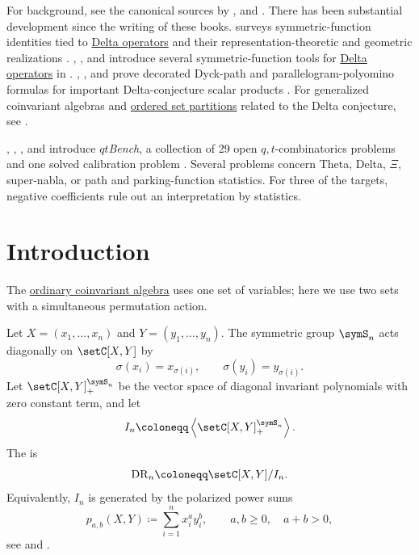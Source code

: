 


For background, see the canonical sources by 
\cite{qtCatalanBook}, and  \cite{Bergeron2009}.
There has been substantial development since the writing of these books.
 surveys symmetric-function identities tied to
\hyperref[deltaOperator]{Delta operators} and their representation-theoretic and geometric realizations
\cite{Rhoades2022Delta}.
, , and  introduce
several symmetric-function tools for \hyperref[deltaOperator]{Delta operators} in
\cite{GarsiaHaglundRomero2018}.
, , and
 prove decorated Dyck-path and parallelogram-polyomino
formulas for important Delta-conjecture scalar products
\cite{DAdderioIraciWyngaerd2022}.  For generalized coinvariant algebras and
\hyperref[setPartitions]{ordered set partitions} related to the Delta
conjecture, see
\cite{HaglundRhoadesShimozono2018,Griffin2021}.

, ,
, and  introduce
\emph{$qt$Bench}, a collection of 29 open $q,t$-combinatorics problems and one
solved calibration problem \cite{CainelliLuccioliIraciPaolini2026x}.  Several
problems concern Theta, Delta, $\Xi$, super-nabla, or path and
parking-function statistics.  For three of the targets, negative coefficients
rule out an interpretation by statistics.

\section[diagonalHarmonics]{Introduction}

The \hyperref[coinvariantAlgebra]{ordinary coinvariant algebra} uses one
set of variables; here we use two sets with a simultaneous permutation action.

Let \(X=(x_1,\dotsc,x_n)\) and \(Y=(y_1,\dotsc,y_n)\).
The symmetric group \(\symS_n\) acts diagonally on
\(\setC[X,Y]\) by
\[
\sigma(x_i)=x_{\sigma(i)}, \qquad \sigma(y_i)=y_{\sigma(i)}.
\]
Let \(\setC[X,Y]^{\symS_n}_{+}\) be the vector space of diagonal invariant
polynomials with zero constant term, and let
\[
 I_n \coloneqq \left\langle \setC[X,Y]^{\symS_n}_{+}\right\rangle.
\]
The \label{diagonalCoinvariantRing} is
\[
 \mathrm{DR}_n \coloneqq \setC[X,Y]/I_n.
\]
Equivalently, \(I_n\) is generated by the polarized power sums
\[
 p_{a,b}(X,Y)\coloneqq \sum_{i=1}^{n}x_i^a y_i^b,
 \qquad a,b\geq 0,\quad a+b\gt 0,
\]
see \cite[Sec.~1.2]{Haiman1994} and \cite[Sec.~2]{qtCatalanBook}.

